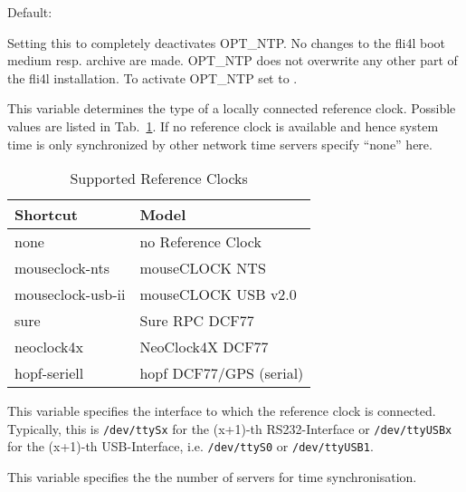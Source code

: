 \begin{description}


  {Default: 

  Setting this to  completely deactivates OPT\_NTP. No changes
  to the fli4l boot medium resp. archive  are made.
  OPT\_NTP does not overwrite any other part of the fli4l installation.
  To activate OPT\_NTP set  to .}


  This variable determines the type of a locally connected reference clock.
  Possible values are listed in Tab.~\ref{table:ntp:refclocks}. If no reference clock
  is available and hence system time is only synchronized by other network time servers
  specify ``none'' here.

  \begin{table}[ht!]
    \centering
    \small
    \caption{Supported Reference Clocks}
    \label{table:ntp:refclocks}
    \begin{tabular}{|l|p{7.5cm}|}
      \hline
      Shortcut & Model \\
      \hline
      none              & no Reference Clock \\
      mouseclock-nts    & mouseCLOCK NTS \\
      mouseclock-usb-ii & mouseCLOCK USB v2.0\\
      sure              & Sure RPC DCF77 \\
      neoclock4x        & NeoClock4X DCF77 \\
      hopf-seriell      & hopf DCF77/GPS (serial) \\
      \hline
    \end{tabular}
  \end{table}


  This variable specifies the interface to which the reference clock is connected.
  Typically, this is \texttt{/dev/ttySx} for the (x+1)-th RS232-Interface or
  \texttt{/dev/ttyUSBx} for the (x+1)-th USB-Interface, i.e. \texttt{/dev/ttyS0} or
  \texttt{/dev/ttyUSB1}.


  This variable specifies the the number of servers for time synchronisation.


\end{description}
